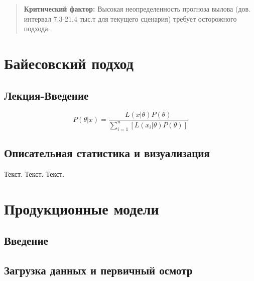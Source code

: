 \documentclass[
  letterpaper,
  DIV=11,
  numbers=noendperiod]{scrreprt}
\begin{document}
\begin{quote}
\textbf{Критический фактор:} Высокая неопределенность прогноза вылова
(дов. интервал 7.3-21.4 тыс.т для текущего сценария) требует осторожного
подхода.
\end{quote}


\chapter{Байесовский
подход}\label{ux431ux430ux439ux435ux441ux43eux432ux441ux43aux438ux439-ux43fux43eux434ux445ux43eux434}

\section{Лекция-Введение}\label{ux43bux435ux43aux446ux438ux44f-ux432ux432ux435ux434ux435ux43dux438ux435}

\[  
P(\theta|x)=\frac{L(x|\theta)P(\theta)}{\sum\limits_{i=1}^{n}{\left[ L(x_i|\theta)P(\theta)\right]}}  
\]

\section{Описательная статистика и
визуализация}\label{ux43eux43fux438ux441ux430ux442ux435ux43bux44cux43dux430ux44f-ux441ux442ux430ux442ux438ux441ux442ux438ux43aux430-ux438-ux432ux438ux437ux443ux430ux43bux438ux437ux430ux446ux438ux44f-1}

Текст. Текст. Текст.


\chapter{Продукционные
модели}\label{ux43fux440ux43eux434ux443ux43aux446ux438ux43eux43dux43dux44bux435-ux43cux43eux434ux435ux43bux438}

\section{Введение}\label{ux432ux432ux435ux434ux435ux43dux438ux435-5}

\section{Загрузка данных и первичный
осмотр}\label{ux437ux430ux433ux440ux443ux437ux43aux430-ux434ux430ux43dux43dux44bux445-ux438-ux43fux435ux440ux432ux438ux447ux43dux44bux439-ux43eux441ux43cux43eux442ux440-1}
\end{document}
